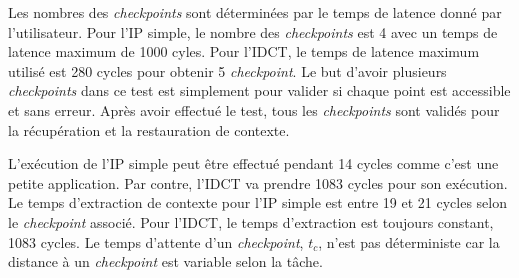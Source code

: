 Les nombres des \emph{checkpoints} sont déterminées par le temps de latence donné par l'utilisateur. Pour l'IP simple,
le nombre des \emph{checkpoints} est 4 avec un temps de latence maximum de 1000 cyles. 
Pour l'IDCT, le temps de latence maximum utilisé est 280 cycles pour obtenir 5 \emph{checkpoint}.
Le but d'avoir plusieurs \emph{checkpoints} dans ce test est simplement pour valider si chaque point est accessible et sans erreur.
Après avoir effectué le test, tous les \emph{checkpoints} sont validés pour la récupération et la restauration de contexte.

L'exécution de l'IP simple peut être effectué pendant 14 cycles comme c'est une petite application. Par contre, l'IDCT
va prendre 1083 cycles pour son exécution. Le temps d'extraction de contexte pour l'IP simple est entre 19 et 21 cycles
selon le \emph{checkpoint} associé. Pour l'IDCT, le temps d'extraction est toujours constant, 1083 cycles. Le temps d'attente
d'un \emph{checkpoint}, $t_c$, n'est pas déterministe car la distance à un \emph{checkpoint} est variable selon la tâche. 


